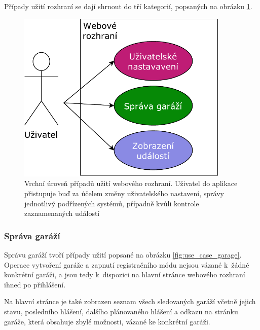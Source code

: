 Případy užití rozhraní se dají shrnout do tří kategorií, popsaných na obrázku \ref{fig:use_case_top}.

\begin{figure}[h!]
    \centering
    \includegraphics[width=0.9\textwidth]{images/use_case_top.pdf}
    \caption[Vrchní úroveň případů užití webového rozhraní]{Vrchní úroveň případů užití webového rozhraní. Uživatel do aplikace přistupuje buď za účelem změny uživatelského nastavení, správy jednotlivý podřízených systémů, případně kvůli kontrole zaznamenaných událostí}
    \label{fig:use_case_top}
\end{figure}

\subsubsection{Správa garáží}

Správu garáží tvoří případy užití popsané na obrázku \ref{fig:use_case_garage}. Operace vytvoření garáže a zapnutí registračního módu nejsou vázané k~žádné konkrétní garáži, a jsou tedy k~dispozici na hlavní stránce webového rozhraní ihned po přihlášení. 

Na hlavní stránce je také zobrazen seznam všech sledovaných garáží včetně jejich stavu, posledního hlášení, dalšího plánovaného hlášení a odkazu na stránku garáže, která obsahuje zbylé možnosti, vázané ke konkrétní garáži.

